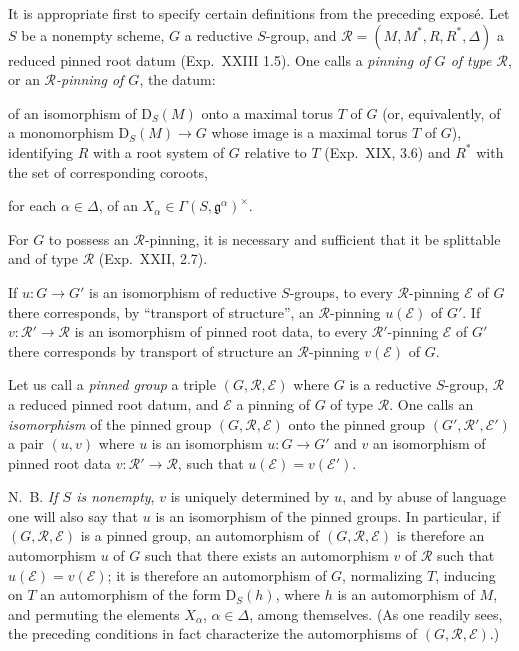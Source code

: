 \label{XXIV.1.0}
It is appropriate first to specify certain definitions from the preceding exposé. Let $S$ be a nonempty scheme, $G$ a reductive $S$-group, and $\mathscr R=(M,M^*,R,R^*,\Delta)$ a reduced pinned root datum (Exp.~XXIII 1.5). One calls a \emph{pinning of $G$ of type $\mathscr R$}, or an \emph{$\mathscr R$-pinning of $G$}, the datum:
\begin{enumeratei}
\item of an isomorphism of $\mathrm D_S(M)$ onto a maximal torus $T$ of $G$ (or, equivalently, of a monomorphism $\mathrm D_S(M)\to G$ whose image is a maximal torus $T$ of $G$), identifying $R$ with a root system of $G$ relative to $T$ (Exp.~XIX, 3.6) and $R^*$ with the set of corresponding coroots,
\item for each $\alpha\in\Delta$, of an $X_\alpha\in\Gamma(S,\mathfrak g^\alpha)^\times$.
\end{enumeratei}
For $G$ to possess an $\mathscr R$-pinning, it is necessary and sufficient that it be splittable and of type $\mathscr R$ (Exp.~XXII, 2.7).

If $u:G\to G'$ is an isomorphism of reductive $S$-groups, to every $\mathscr R$-pinning $\mathscr E$ of $G$ there corresponds, by ``transport of structure'', an $\mathscr R$-pinning $u(\mathscr E)$ of $G'$. If $v:\mathscr R'\to\mathscr R$ is an isomorphism of pinned root data, to every $\mathscr R'$-pinning $\mathscr E$ of $G'$ there corresponds by transport of structure an $\mathscr R$-pinning $v(\mathscr E)$ of $G$.

Let us call a \emph{pinned group} a triple $(G,\mathscr R,\mathscr E)$ where $G$ is a reductive $S$-group, $\mathscr R$ a reduced pinned root datum, and $\mathscr E$ a pinning of $G$ of type $\mathscr R$. One calls an \emph{isomorphism} of the pinned group $(G,\mathscr R,\mathscr E)$ onto the pinned group $(G',\mathscr R',\mathscr E')$ a pair $(u,v)$ where $u$ is an isomorphism $u:G\to G'$ and $v$ an isomorphism of pinned root data $v:\mathscr R'\to\mathscr R$, such that $u(\mathscr E)=v(\mathscr E')$.

N.~B. \emph{If $S$ is nonempty}, $v$ is uniquely determined by $u$, and by abuse of language one will also say that $u$ is an isomorphism of the pinned groups. In particular, if $(G,\mathscr R,\mathscr E)$ is a pinned group, an automorphism of $(G,\mathscr R,\mathscr E)$ is therefore an automorphism $u$ of $G$ such that there exists an automorphism $v$ of $\mathscr R$ such that $u(\mathscr E)=v(\mathscr E)$; it is therefore an automorphism of $G$, normalizing $T$, inducing on $T$ an automorphism of the form $\mathrm D_S(h)$, where $h$ is an automorphism of $M$, and permuting the elements $X_\alpha$, $\alpha\in\Delta$, among themselves. (As one readily sees, the preceding conditions in fact characterize the automorphisms of $(G,\mathscr R,\mathscr E)$.)


